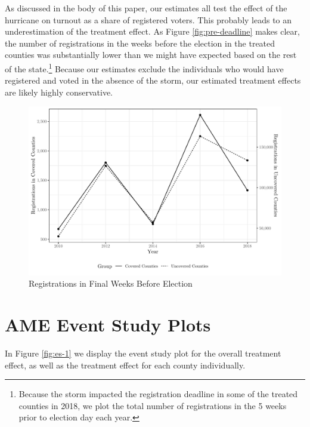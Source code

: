 \documentclass[
  12pt,
]{article}
\begin{document}
As discussed in the body of this paper, our estimates all test the effect of the hurricane on turnout as a share of registered voters. This probably leads to an underestimation of the treatment effect. As Figure \ref{fig:pre-deadline} makes clear, the number of registrations in the weeks before the election in the treated counties was substantially lower than we might have expected based on the rest of the state.\footnote{Because the storm impacted the registration deadline in some of the treated counties in 2018, we plot the total number of registrations in the 5 weeks prior to election day each year.} Because our estimates exclude the individuals who would have registered and voted in the absence of the storm, our estimated treatment effects are likely highly conservative.

\begin{figure}[H]

{\centering \includegraphics{si_files/figure-latex/regs-chunk-1} 

}

\caption{\label{fig:pre-deadline}Registrations in Final Weeks Before Election}\label{fig:regs-chunk}
\end{figure}

\hypertarget{ame-event-study-plots}{%
\section*{AME Event Study Plots}\label{ame-event-study-plots}}

In Figure \ref{fig:es-1} we display the event study plot for the overall treatment effect, as well as the treatment effect for each county individually.
\end{document}
